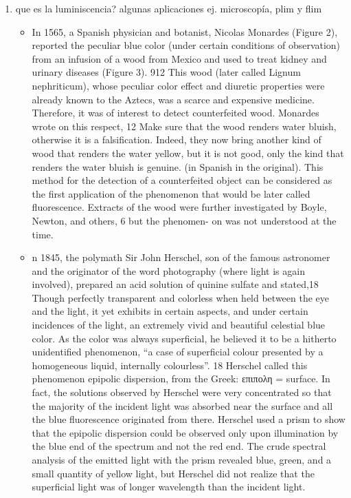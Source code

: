 
\begin{enumerate}
    \item que es la luminiscencia? algunas aplicaciones ej. microscopía, plim y flim
    \begin{itemize}
        \item In 1565, a Spanish physician and botanist, Nicolas Monardes (Figure 2), reported the peculiar blue color (under certain  conditions of observation) from an infusion of a wood from Mexico and used to treat kidney and urinary diseases (Figure 3). 912 This wood (later called Lignum nephriticum), whose peculiar color effect and diuretic properties were already known to the Aztecs, was a scarce and expensive medicine. Therefore, it was of interest to detect counterfeited wood. Monardes wrote on this respect, 12 Make sure that the wood renders water bluish, otherwise it is a falsification. Indeed, they now bring another kind of wood that renders the water yellow, but it is not good, only the kind that renders the water bluish is genuine. (in Spanish in the original). This method for the detection of a counterfeited object can be considered as the first application of the phenomenon that would be later called fluorescence. Extracts of the wood were further investigated by Boyle, Newton, and others, 6 but the phenomen- on was not understood at the time.
        \item n 1845, the polymath Sir John Herschel, son of the famous astronomer and the originator of the word photography (where light is again involved), prepared an acid solution of quinine sulfate and stated,18 Though perfectly transparent and colorless when held between the eye and the light, it yet exhibits in certain aspects, and under certain incidences of the light, an extremely vivid and beautiful celestial blue color. As the color was always superficial, he believed it to be a hitherto unidentified phenomenon, “a case of superficial colour presented by a homogeneous liquid, internally colourless”. 18 Herschel called this phenomenon epipolic dispersion, from the Greek: επιπολη = surface. In fact, the solutions observed by Herschel were very concentrated so that the majority of the incident light was absorbed near the surface and all the blue fluorescence originated from there. Herschel used a prism to show that the epipolic dispersion could be observed only upon illumination by the blue end of the spectrum and not the red end. The crude spectral analysis of the emitted light with the prism revealed blue, green, and a small quantity of yellow light, but Herschel did not realize that the superficial light was of longer wavelength than the incident light.

\end{itemize}
\end{enumerate}
